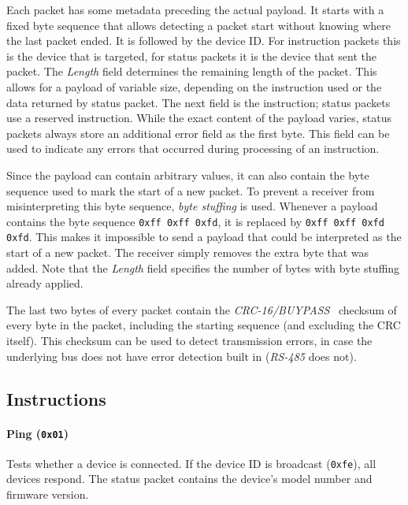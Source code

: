 Each packet has some metadata preceding the actual payload. It starts with a fixed byte sequence that allows
detecting a packet start without knowing where the last packet ended. It is followed by the device ID. For
instruction packets this is the device that is targeted, for status packets it is the device that sent the
packet. The \textit{Length} field determines the remaining length of the packet. This allows for a payload of variable
size, depending on the instruction used or the data returned by status packet. The next field is the instruction;
status packets use a reserved instruction. While the exact content of the payload varies, status packets always
store an additional error field as the first byte. This field can be used to indicate any errors that occurred
during processing of an instruction.

Since the payload can contain arbitrary values, it can also contain the byte sequence used to mark the start of
a new packet. To prevent a receiver from misinterpreting this byte sequence, \textit{byte stuffing} is used.
Whenever a payload contains the byte sequence \lstinline{0xff 0xff 0xfd}, it is replaced by
\lstinline{0xff 0xff 0xfd 0xfd}. This makes it impossible to send a payload that could be interpreted as the
start of a new packet. The receiver simply removes the extra byte that was added. Note that the
\textit{Length} field specifies the number of bytes with byte stuffing already applied.

The last two bytes of every packet contain the \textit{CRC-16/BUYPASS}~\cite{crc-16-buypass} checksum of
every byte in the packet, including the starting sequence (and excluding the CRC itself). This checksum
can be used to detect transmission errors, in case the underlying bus does not have error detection built
in (\textit{RS-485} does not).

\subsection{Instructions}
\label{basics/dynamixel-protocol/instructions}

\paragraph{Ping (\lstinline{0x01})}

Tests whether a device is connected. If the device ID is broadcast (\lstinline{0xfe}), all devices
respond. The status packet contains the device's model number and firmware version.

